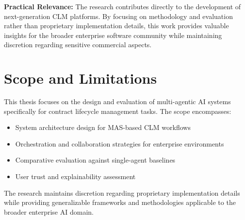 \textbf{Practical Relevance:} The research contributes directly to the development of next-generation CLM platforms. By focusing on methodology and evaluation rather than proprietary implementation details, this work provides valuable insights for the broader enterprise software community while maintaining discretion regarding sensitive commercial aspects.

\section{Scope and Limitations}

This thesis focuses on the design and evaluation of multi-agentic AI systems specifically for contract lifecycle management tasks. The scope encompasses:

\begin{itemize}
    \item System architecture design for MAS-based CLM workflows
    \item Orchestration and collaboration strategies for enterprise environments
    \item Comparative evaluation against single-agent baselines
    \item User trust and explainability assessment
\end{itemize}

The research maintains discretion regarding proprietary implementation details while providing generalizable frameworks and methodologies applicable to the broader enterprise AI domain.
